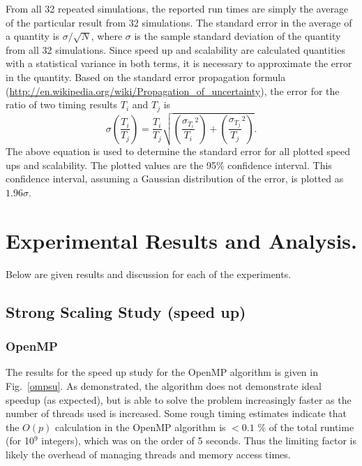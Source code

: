\documentclass[12pt]{article}
\begin{document}
\begin{algorithm}
{{{From all 32 repeated simulations, the reported run times are simply the average of
the particular result from 32
simulations. The standard error in the average of a quantity is $\sigma/\sqrt{N}$,
where $\sigma$ is the sample standard deviation of the quantity from all 32 simulations.  Since speed up and
scalability are calculated quantities with a statistical variance in both terms, it
is necessary to approximate the error in the quantity.  
Based on the standard error propagation formula
(\url{http://en.wikipedia.org/wiki/Propagation_of_uncertainty}), the error for the
ratio of two timing results $T_i$ and $T_j$ is
\begin{equation}
    \sigma \left( \frac{T_i}{T_j} \right) = \frac{T_i}{T_j}
    \sqrt{\left(\frac{\sigma_{T_i}}{T_i}^2\right) + 
    \left(\frac{\sigma_{T_j}}{T_j}^2\right)}
    \label{err}.
\end{equation}
The above equation is used to determine the standard error for all plotted speed ups
and scalability.  The plotted values are the 95\% confidence interval. This
confidence interval, assuming a
Gaussian distribution of the error, is plotted as $1.96 \sigma$.

\section{Experimental Results and Analysis.}

Below are given results and discussion for each of the experiments.

\subsection{Strong Scaling Study (speed up)}

\subsubsection{OpenMP}

The results for the speed up study for the OpenMP algorithm is given in
Fig.~\ref{ompsu}. As demonstrated, the algorithm does not demonstrate ideal speedup
(as expected), but is able to solve the
problem increasingly faster as the number of threads used is increased.  Some rough timing estimates indicate
that the $O(p)$ calculation in the OpenMP algorithm is $<0.1$ \% of the total runtime
(for 10$^9$ integers), which was on the order of 5 seconds.  Thus the limiting
factor is likely the overhead of managing threads and memory access times.  

}}}
\end{algorithm}
\end{document}
